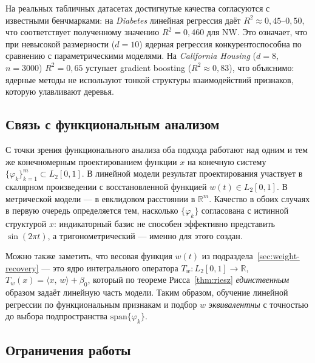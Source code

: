 \documentclass[12pt,a4paper]{article}
\theoremstyle{definition}
\theoremstyle{remark}
\newcommand{\R}{\mathbb{R}}
\newcommand{\Ltwo}{L_{2}[0,1]}
\newcommand{\inner}[2]{\langle #1,\,#2\rangle}
\begin{document}
На реальных табличных датасетах достигнутые качества согласуются с известными
бенчмарками: на \textit{Diabetes} линейная регрессия даёт
$R^{2}\!\approx\!0{,}45$--$0{,}50$, что соответствует полученному значению
$R^{2}=0{,}460$ для NW. Это означает, что при невысокой размерности
($d=10$) ядерная регрессия конкурентоспособна по сравнению с
параметрическими моделями. На \textit{California Housing} ($d=8$, $n=3000$)
$R^{2}\!=\!0{,}65$ уступает gradient boosting ($R^{2}\!\approx\!0{,}83$),
что объяснимо: ядерные методы не используют тонкой структуры взаимодействий
признаков, которую улавливают деревья.

\subsection{Связь с функциональным анализом}

С точки зрения функционального анализа оба подхода работают над одним и тем
же конечномерным проектированием функции $x$ на конечную систему
$\{\varphi_{k}\}_{k=1}^{m}\subset\Ltwo$. В линейной модели результат
проектирования участвует в скалярном произведении с восстановленной функцией
$w(t)\in\Ltwo$. В метрической модели --- в евклидовом расстоянии в
$\R^{m}$. Качество в обоих случаях в первую очередь определяется тем,
насколько $\{\varphi_{k}\}$ согласована с истинной структурой $x$:
индикаторный базис не способен эффективно представить $\sin(2\pi t)$, а
тригонометрический --- именно для этого создан.

Можно также заметить, что весовая функция $w(t)$ из
подраздела~\ref{sec:weight-recovery} --- это ядро интегрального оператора
$T_{w}\colon\Ltwo\to\R$, $T_{w}(x)=\inner{x}{w}+\beta_{0}$, который по
теореме Рисса~\ref{thm:riesz} \emph{единственным} образом задаёт линейную
часть модели. Таким образом, обучение линейной регрессии по функциональным
признакам и подбор $w$ \emph{эквивалентны} с точностью до выбора подпространства
$\mathrm{span}\{\varphi_{k}\}$.

\subsection{Ограничения работы}
\end{document}
